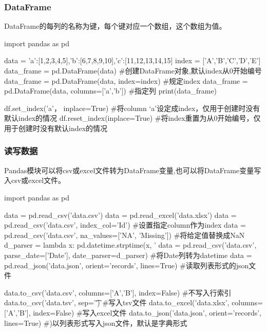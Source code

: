     \subsubsection{DataFrame}
      DataFrame的每列的名称为键，每个键对应一个数组，这个数组为值。
      \begin{codeblock}[language=python, caption={Create a dataframe}]
        import pandas as pd

        data = {'a':[1,2,3,4,5],'b':[6,7,8,9,10],'c':[11,12,13,14,15]}
        index = ['A','B','C','D','E']
        data_frame = pd.DataFrame(data) #创建DataFrame对象,默认index从0开始编号
        data_frame = pd.DataFrame(data, index=index) #规定index
        data_frame = pd.DataFrame(data, columns=['a','b']) #指定列
        print(data_frame)

        df.set_index('a'， inplace=True) #将column `a'设定成index，仅用于创建时没有默认index的情况
        df.reset_index(inplace=True) #将index重置为从0开始编号，仅用于创建时没有默认index的情况
      \end{codeblock}

    \subsubsection{读写数据}
      Pandas模块可以将csv或excel文件转为DataFrame变量,也可以将DataFrame变量写入csv或excel文件。
      \begin{codeblock}[language=python, caption={Read and write files using Pandas}]
        import pandas as pd

        data = pd.read_csv('data.csv')
        data = pd.read_excel('data.xlsx')
        data = pd.read_csv('data.csv', index_col='Id') #设置指定column作为index
        data = pd.read_csv('data.csv', na_values=['NA', 'Missing']) #将给定值替换成NaN
        d_parser = lambda x: pd.datetime.strptime(x, '%
        data = pd.read_csv('data.csv', parse_date=['Date'], date_parser=d_parser) 
            #将Date列转为datetime
        data = pd.read_json('data.json', orient='records', lines=True) 
            #读取列表形式的json文件

        data.to_csv('data.csv', columns=['A','B'], index=False) #不写入行索引
        data.to_csv('data.tsv', sep='\t') #写入tsv文件
        data.to_excel('data.xlsx', columns=['A','B'], index=False) #写入excel文件
        data.to_json('data.json', orient='records', lines=True) #)以列表形式写入json文件，默认是字典形式
      \end{codeblock}

